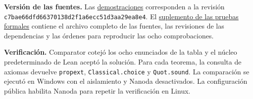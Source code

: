 \documentclass[spanish,11pt,a4paper]{article}
\begin{document}
\textbf{Versión de las fuentes.} Las \href{https://github.com/jtraverso/typed-triangle-absorption/tree/c7bae66dfd66370138d2f1a6ecc51d3aa29ea8e4}{demostraciones} corresponden a la revisión \nolinkurl{c7bae66dfd66370138d2f1a6ecc51d3aa29ea8e4}. El \href{https://github.com/jtraverso/nash-williams-triangle-decompositions-release/tree/doubled-ears-preprint-1.0-r3/series_notes/DOUBLED_EAR_ABSORBERS/preprint-1.0/formalization}{suplemento de las pruebas formales} contiene el archivo completo de las fuentes, las revisiones de las dependencias y las órdenes para reproducir las ocho comprobaciones.

\textbf{Verificación.} Comparator cotejó los ocho enunciados de la tabla y el núcleo predeterminado de Lean aceptó la solución. Para cada teorema, la consulta de axiomas devuelve \texttt{propext}, \texttt{Classical.choice} y \texttt{Quot.sound}. La comparación se ejecutó en Windows con el aislamiento y Nanoda desactivados. La configuración pública habilita Nanoda para repetir la verificación en Linux.
\end{document}
